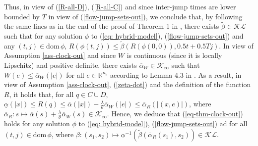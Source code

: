 \documentclass[a4paper, 9pt, twocolumn]{IEEEtran}
\theoremstyle{plain}
\theoremstyle{definition}
\newcommand{\dom}{\ensuremath{\text{dom}\,}}
\newcommand{\R}[2]{\ensuremath{\mathbb{R}^{#1}_{#2}}}
\newcommand{\Kinf}{\ensuremath{\mathcal{K}_{\infty}}}
\newcommand{\KL}{\ensuremath{\mathcal{KL}}}
\begin{document}
Thus, in view of (\ref{R-all-D}), (\ref{R-all-C}) and since inter-jump times are lower bounded by $T$ in view of (\ref{flow-jump-sets-out}), we conclude that, by following the same lines as in the end of the proof of Theorem 1 in \cite{Nesic2009explicit}, there exists $\tilde{\beta} \in \KL$ such that for any solution $\phi$ to (\ref{eq: hybrid-model}), (\ref{flow-jump-sets-out}) and any $(t,j) \in \dom \phi$, $R(\phi(t,j)) \leq \tilde{\beta}(R(\phi(0,0)), 0.5t+0.5Tj)$. In view of Assumption \ref{ass-clock-out} and since $W$ is continuous (since it is locally Lipschitz) and positive definite, there exists $\overline{\alpha}_{W}\in \Kinf$ such that $W(e) \leq \overline{\alpha}_{W}(|e|)$ for all $e \in \R{n_{e}}{}$ according to Lemma 4.3 in \cite{Khalil}. As a result, in view of Assumption \ref{ass-clock-out}, (\ref{zeta-dot}) and the definition of the function $R$, it holds that, for all $q \in C\cup D$, $\underline{\alpha}(|x|) \leq R(q) \leq \overline{\alpha}(|x|) + \frac{\lambda}{\theta}\overline{\alpha}_{W}(|e|) \leq \overline{\alpha}_{R}(|(x,e)|)$, where $\overline{\alpha}_{R}: s \mapsto \overline{\alpha}(s) + \frac{\lambda}{\theta}\overline{\alpha}_{W}(s) \in \Kinf$. Hence, we deduce that (\ref{eq-thm-clock-out}) holds for any solution $\phi$ to (\ref{eq: hybrid-model}), (\ref{flow-jump-sets-out}) ad for all $(t,j) \in \dom \phi$, where $\beta: (s_{1}, s_{2}) \mapsto \underline{\alpha}^{-1}(\tilde{\beta}(\overline{\alpha}_{R}(s_{1}),s_{2})) \in \KL$.
\end{document}
